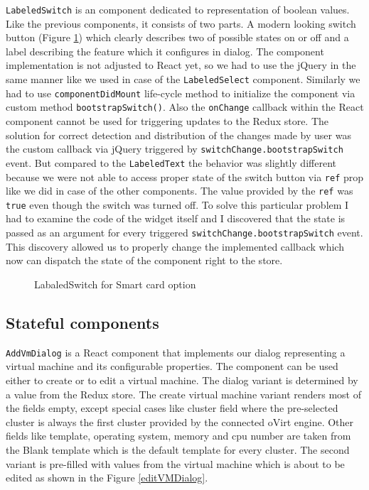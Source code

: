 \texttt{LabeledSwitch} is an component dedicated to representation of boolean values. Like the previous components, it consists of two parts. A modern looking switch button (Figure \ref{switch}) which clearly describes two of possible states on or off and a label describing the feature which it configures in dialog. The component implementation is not adjusted to React yet, so we had to use the jQuery in the same manner like  we used in case of the \texttt{LabeledSelect} component. Similarly we had to use \texttt{componentDidMount} life-cycle method to initialize the component via custom method \texttt{bootstrapSwitch()}. Also the \texttt{onChange} callback within the React component cannot be used for triggering updates to the Redux store. The solution for correct detection and distribution of the changes made by user was the custom callback via jQuery triggered by \texttt{switchChange.bootstrapSwitch} event. But compared to the \texttt{LabeledText} the behavior was slightly different because we were not able to access proper state of the switch button via \texttt{ref} prop like we did in case of the other components. The value provided by the \texttt{ref} was \texttt{true} even though the switch was turned off. To solve this particular problem I had to examine the code of the widget itself and I discovered that the state is passed as an argument for every triggered \texttt{switchChange.bootstrapSwitch} event. This discovery allowed us to properly change the implemented callback which now can dispatch the state of the component right to the store.

\begin{figure}[h]
\caption{LabaledSwitch for Smart card option}
\label{switch}
\end{figure}



\subsection{Stateful components}
\texttt{AddVmDialog} is a React component that implements our dialog representing a virtual machine and its configurable properties. The component can be used either to create or to edit a virtual machine. The dialog variant is determined by a value from the Redux store. The create virtual machine variant renders most of the fields empty, except special cases like cluster field where the pre-selected cluster is always the first cluster provided by the connected oVirt engine. Other fields like template, operating system, memory and cpu number are taken from the Blank template which is the default template for every cluster. The second variant is pre-filled with values from the virtual machine which is about to be edited as shown in the Figure \ref{editVMDialog}.

